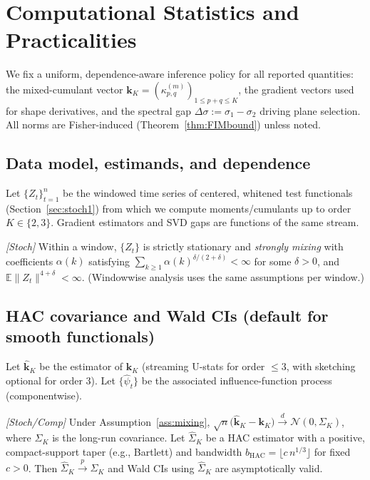 ﻿\section{Computational Statistics and Practicalities}\label{sec:stats1}

We fix a uniform, dependence-aware inference policy for all reported quantities:
the mixed-cumulant vector
$\mathbf k_K=(\kappa^{(m)}_{p,q})_{1\le p+q\le K}$,
the gradient vectors used for shape derivatives,
and the spectral gap $\Delta\sigma:=\sigma_1-\sigma_2$ driving plane selection.
All norms are Fisher-induced (Theorem~\ref{thm:FIMbound}) unless noted.

\setcounter{lemma}{12}
\setcounter{proposition}{2}

\subsection{Data model, estimands, and dependence}\label{subsec:stats-model}

Let $\{Z_t\}_{t=1}^n$ be the windowed time series of centered, whitened test functionals (Section~\ref{sec:stoch1}) from which we compute moments/cumulants up to order $K\in\{2,3\}$. Gradient estimators and SVD gaps are functions of the same stream.

\begin{assumption}\label{ass:mixing}
\emph{[\textup{Stoch}]}
Within a window, $\{Z_t\}$ is strictly stationary and \emph{strongly mixing} with coefficients $\alpha(k)$ satisfying $\sum_{k\ge1}\alpha(k)^{\delta/(2+\delta)}<\infty$ for some $\delta>0$, and $\mathbb E\|Z_t\|^{4+\delta}<\infty$. (Windowwise analysis uses the same assumptions per window.)
\end{assumption}

\subsection{HAC covariance and Wald CIs (default for smooth functionals)}\label{subsec:hac}

Let $\widehat{\mathbf k}_K$ be the estimator of $\mathbf k_K$ (streaming U-stats for order $\le3$, with sketching optional for order 3).
Let $\{\widehat\psi_t\}$ be the associated influence-function process (componentwise).

\begin{lemma}\label{lem:hac}
\emph{[\textup{Stoch/Comp}]}
Under Assumption~\ref{ass:mixing},
\(
\sqrt{n}\big(\widehat{\mathbf k}_K-\mathbf k_K\big)\xrightarrow{d}\mathcal N(0,\Sigma_K)
\),
where $\Sigma_K$ is the long-run covariance.
Let $\widehat\Sigma_K$ be a HAC estimator with a positive, compact-support taper (e.g., Bartlett) and bandwidth
$b_{\mathrm{HAC}}=\lfloor c\,n^{1/3}\rfloor$ for fixed $c>0$.
Then $\widehat\Sigma_K\xrightarrow{p}\Sigma_K$ and Wald CIs using $\widehat\Sigma_K$ are asymptotically valid.
\end{lemma}

